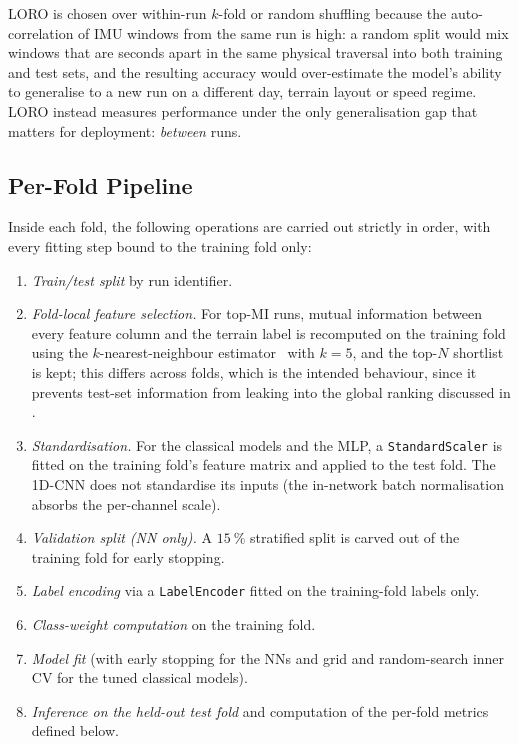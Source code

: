 LORO is chosen over within-run $k$-fold or random shuffling because the auto-correlation of IMU windows from the same run is high: a random split would mix windows that are seconds apart in the same physical traversal into both training and test sets, and the resulting accuracy would over-estimate the model's ability to generalise to a new run on a different day, terrain layout or speed regime. LORO instead measures performance under the only generalisation gap that matters for deployment: \emph{between} runs.

\subsection{Per-Fold Pipeline}
\label{sec:per_fold_pipeline}

Inside each fold, the following operations are carried out strictly in order, with every fitting step bound to the training fold only:
\begin{enumerate}
    \item \emph{Train/test split} by run identifier.
    \item \emph{Fold-local feature selection.} For top-MI runs, mutual information between every feature column and the terrain label is recomputed on the training fold using the $k$-nearest-neighbour estimator~\cite{Kraskov2004} with $k=5$, and the top-$N$ shortlist is kept; this differs across folds, which is the intended behaviour, since it prevents test-set information from leaking into the global ranking discussed in .
    \item \emph{Standardisation.} For the classical models and the MLP, a \texttt{StandardScaler} is fitted on the training fold's feature matrix and applied to the test fold. The 1D-CNN does not standardise its inputs (the in-network batch normalisation absorbs the per-channel scale).
    \item \emph{Validation split (NN only).} A $\SI{15}{\percent}$ stratified split is carved out of the training fold for early stopping.
    \item \emph{Label encoding} via a \texttt{LabelEncoder} fitted on the training-fold labels only.
    \item \emph{Class-weight computation} on the training fold.
    \item \emph{Model fit} (with early stopping for the NNs and grid and random-search inner CV for the tuned classical models).
    \item \emph{Inference on the held-out test fold} and computation of the per-fold metrics defined below.
\end{enumerate}

